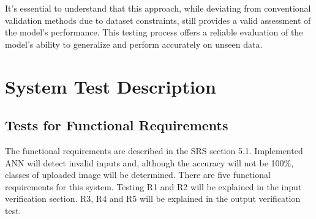 \documentclass[12pt, titlepage]{article}
\begin{document}
It's essential to understand that this approach, while deviating from 
conventional validation methods due 
to dataset constraints, still provides a valid assessment of the model's performance. 
This testing process offers a reliable evaluation of the model's ability to 
generalize and perform accurately on unseen data.






\section{System Test Description}\label{SystemTest}
	
\subsection{Tests for Functional Requirements}

The functional requirements are described in the 
SRS \cite{SRS} section 5.1. 
Implemented ANN will detect invalid inputs and, although the accuracy will not be 100\%,
classes of uploaded image will be determined. There are five functional requirements for
this system. Testing R1 and R2 will be explained in 
the input verification section. R3, R4 and R5 will be
explained in the output verification test.

\end{document}
